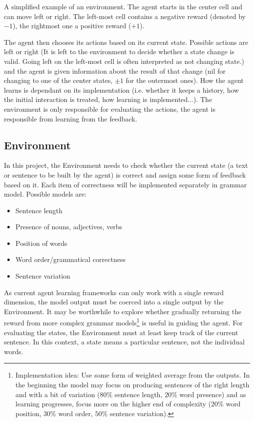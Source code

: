 \documentclass[a4paper, justified]{tufte-handout}
\begin{document}
\begin{marginfigure}
\caption{A simplified example of an environment. The agent starts in the center cell and can move left or right. The left-most cell contains a negative reward (denoted by $-1$), the rightmost one a positive reward ($+1$).}
\end{marginfigure}

The agent then chooses its actions based on its current state. Possible actions are left or right (It is left to the environment to decide whether a state change is valid. Going left on the left-most cell is often interpreted as not changing state.) and the agent is given information about the result of that change (nil for changing to one of the center states, $\pm1$ for the outermost ones). How the agent learns is dependant on its implementation (i.e. whether it keeps a history, how the initial interaction is treated, how learning is implemented...). The environment is only responsible for evaluating the actions, the agent is responsible from learning from the feedback.

\subsection{Environment}

In this project, the Environment needs to check whether the current state (a text or sentence to be built by the agent) is correct and assign some form of feedback based on it. Each item of correctness will be implemented separately in grammar model. Possible models are:
\begin{itemize}
\item{Sentence length}
\item{Presence of nouns, adjectives, verbs}
\item{Position of words}
\item{Word order/grammatical correctness}
\item{Sentence variation}
\end{itemize}
As current agent learning frameworks can only work with a single reward dimension, the model output must be coerced into a single output by the Environment. It may be worthwhile to explore whether gradually returning the reward from more complex grammar models\footnote{Implementation idea: Use some form of weighted average from the outputs. In the beginning the model may focus on producing sentences of the right length and with a bit of variation ($80\%$ sentence length, $20\%$ word presence) and as learning progresses, focus more on the higher end of complexity ($20\%$ word position, $30\%$ word order, $50\%$ sentence variation).} is useful in guiding the agent. For evaluating the states, the Environment must at least keep track of the current sentence. In this context, a state means a particular sentence, not the individual words.
\end{document}
